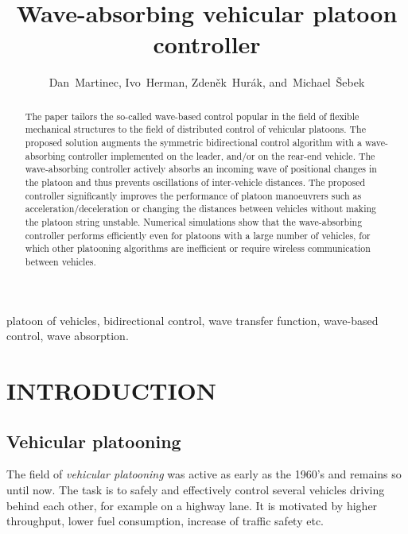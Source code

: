 \documentclass[final,5p,times,twocolumn]{elsarticle}
\begin{document}
\begin{frontmatter}
\title{Wave-absorbing vehicular platoon controller}


\author[label1]{Dan~Martinec,
        Ivo~Herman,
        Zden\v{e}k~Hur\'{a}k,
        and~Michael~\v{S}ebek}

\address[label1]{All authors are with the Department of Control Engineering, Czech Technical University in Prague, Prague, Czech Republic, (e-mails: martinec.dan@fel.cvut.cz; ivo.herman@fel.cvut.cz; hurak@fel.cvut.cz sebekm1@fel.cvut.cz)}




\begin{abstract}
The paper tailors the so-called wave-based control popular in the field of flexible mechanical structures to the field of distributed control of vehicular platoons. The proposed solution augments the symmetric bidirectional control algorithm with a wave-absorbing controller implemented on the leader, and/or on the rear-end vehicle. The wave-absorbing controller actively absorbs an incoming wave of positional changes in the platoon and thus prevents oscillations of inter-vehicle distances. The proposed controller significantly improves the performance of platoon manoeuvrers such as acceleration/deceleration or changing the distances between vehicles without making the platoon string unstable. Numerical simulations show that the wave-absorbing controller performs efficiently even for platoons with a large number of vehicles, for which other platooning algorithms are inefficient or require wireless communication between vehicles.
\end{abstract}

\begin{keyword}
platoon of vehicles, bidirectional control, wave transfer function, wave-based control, wave absorption.
\end{keyword}


\end{frontmatter}




\section{INTRODUCTION}
\subsection{Vehicular platooning}
The field of \emph{vehicular platooning} was active as early as the 1960's and remains so until now. The task is to safely and effectively control several vehicles driving behind each other, for example on a highway lane. It is motivated by higher throughput, lower fuel consumption, increase of traffic safety etc.
\end{document}
